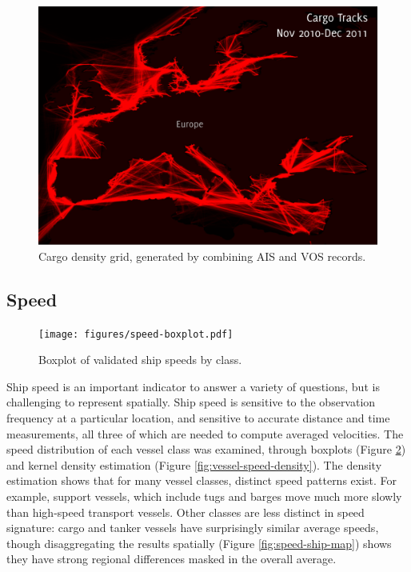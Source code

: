 \begin{figure}[h]
  \centering
    \includegraphics[width=140mm]{figures/cargo-lanes-eu-red-labeled.pdf}
  \caption[Cargo density, Europe]{Cargo density grid, generated by combining AIS and VOS records.}
  \label{fig:eu-cargo-density}
\end{figure}


\subsection{Speed}

\begin{figure}
  \centering
  \hspace*{-0.2in}
  \texttt{[image: figures/speed-boxplot.pdf]}
  \caption[Validated ship speeds by class]{Boxplot of validated ship speeds by class.}
  \label{fig:vessel-speed-boxplot} %
\end{figure}

Ship speed is an important indicator to answer a variety of questions, but is challenging to represent spatially. Ship speed is sensitive to the observation frequency at a particular location, and sensitive to accurate distance and time measurements, all three of which are needed to compute averaged velocities. The speed distribution of each vessel class was examined, through boxplots (Figure \ref{fig:vessel-speed-boxplot}) and kernel density estimation (Figure \ref{fig:vessel-speed-density}). The density estimation shows that for many vessel classes, distinct speed patterns exist. For example, support vessels, which include tugs and barges move much more slowly than high-speed transport vessels. Other classes are less distinct in speed signature: cargo and tanker vessels have surprisingly similar average speeds, though disaggregating the results spatially (Figure \ref{fig:speed-ship-map}) shows they have strong regional differences masked in the overall average.

